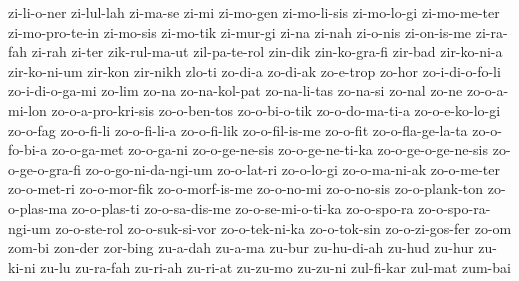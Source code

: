 {zi-li-o-ner zi-lul-lah zi-ma-se zi-mi zi-mo-gen zi-mo-li-sis zi-mo-lo-gi
zi-mo-me-ter zi-mo-pro-te-in zi-mo-sis zi-mo-tik zi-mur-gi zi-na zi-nah
zi-o-nis zi-on-is-me zi-ra-fah zi-rah zi-ter zik-rul-ma-ut zil-pa-te-rol
zin-dik zin-ko-gra-fi zir-bad zir-ko-ni-a zir-ko-ni-um zir-kon zir-nikh
zlo-ti zo-di-a zo-di-ak zo-e-trop zo-hor zo-i-di-o-fo-li zo-i-di-o-ga-mi
zo-lim zo-na zo-na-kol-pat zo-na-li-tas zo-na-si zo-nal zo-ne
zo-o-a-mi-lon zo-o-a-pro-kri-sis zo-o-ben-tos zo-o-bi-o-tik
zo-o-do-ma-ti-a zo-o-e-ko-lo-gi zo-o-fag zo-o-fi-li zo-o-fi-li-a
zo-o-fi-lik zo-o-fil-is-me zo-o-fit zo-o-fla-ge-la-ta zo-o-fo-bi-a
zo-o-ga-met zo-o-ga-ni zo-o-ge-ne-sis zo-o-ge-ne-ti-ka zo-o-ge-o-ge-ne-sis
zo-o-ge-o-gra-fi zo-o-go-ni-da-ngi-um zo-o-lat-ri zo-o-lo-gi zo-o-ma-ni-ak
zo-o-me-ter zo-o-met-ri zo-o-mor-fik zo-o-morf-is-me zo-o-no-mi
zo-o-no-sis zo-o-plank-ton zo-o-plas-ma zo-o-plas-ti zo-o-sa-dis-me
zo-o-se-mi-o-ti-ka zo-o-spo-ra zo-o-spo-ra-ngi-um zo-o-ste-rol
zo-o-suk-si-vor zo-o-tek-ni-ka zo-o-tok-sin zo-o-zi-gos-fer zo-om zom-bi
zon-der zor-bing zu-a-dah zu-a-ma zu-bur zu-hu-di-ah zu-hud zu-hur
zu-ki-ni zu-lu zu-ra-fah zu-ri-ah zu-ri-at zu-zu-mo zu-zu-ni zul-fi-kar
zul-mat zum-bai
}

